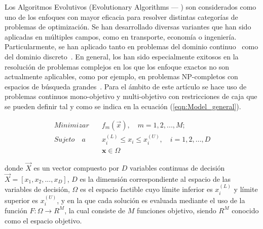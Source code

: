 Los Algoritmos Evolutivos (Evolutionary Algorithms --- \EAS{}) son considerados como uno de los enfoques con mayor eficacia para resolver distintas categorías de 
problemas de optimización.
%
Se han desarrollado diversas variantes que han sido aplicadas en múltiples campos, como en transporte, economía o ingeniería.
%
Particularmente, se han aplicado tanto en problemas del dominio continuo~\cite{glover2005handbook} como del dominio discreto~\cite{Joel:Dynamic_FAP}.
%
En general, los \EAS{} han sido especialmente exitosos en la resolución de problemas complejos en los que los enfoque exactos
no son actualmente aplicables, como por ejemplo, en problemas NP-completos con espacios de búsqueda grandes~\cite{chakraborty2008advances}.
% 
Para el ámbito de este artículo se hace uso de problemas continuos mono-objetivo y multi-objetivo con restricciones de caja que se pueden definir 
tal y como se indica en la ecuación (\ref{eqn:Model_general}).

\begin{equation}
 \label{eqn:Model_general}
   \begin{split}
    Minimizar \quad & f_m(\vec{x}), \quad m = 1, 2,...,M;\\
   Sujeto \quad a \quad &  x_i^{(L)} \leq x_i \leq x_i^{(U)}, \quad i=1,2,..., D \\
   & \mathbf{x} \in \Omega
   \end{split}
\end{equation}

donde $\vec{X}$ es un vector compuesto por $D$ variables continuas de decisión $\vec{X} = [x_1, x_2, ..., x_D]$, 
$D$ es la dimensión correspondiente al espacio de las variables de decisión, 
$\Omega$ es el espacio factible cuyo límite inferior es $x_i^{(L)}$ y límite superior es $x_i^{(U)}$, y en la que cada solución es evaluada mediante el uso de la función $F : \Omega \rightarrow R^M$, la cual consiste de $M$ funciones objetivo, siendo $R^M$ conocido como el espacio objetivo.

